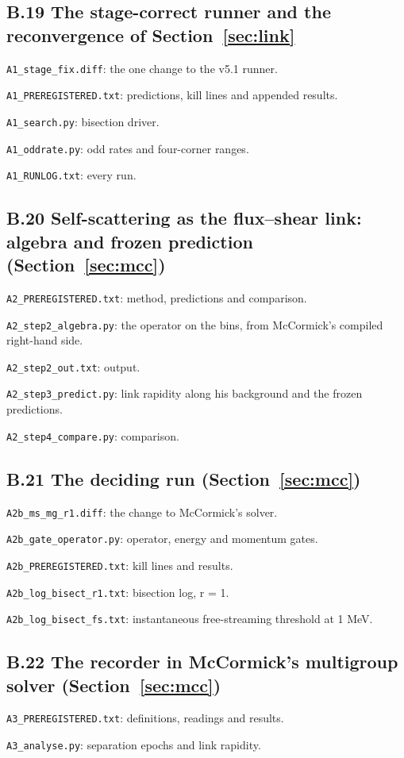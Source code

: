 \subsection*{B.19 The stage-correct runner and the reconvergence of Section~\ref{sec:link}}
\noindent\texttt{A1\_stage\_fix.diff}: the one change to the v5.1 runner.

\noindent\texttt{A1\_PREREGISTERED.txt}: predictions, kill lines and appended results.

\noindent\texttt{A1\_search.py}: bisection driver.

\noindent\texttt{A1\_oddrate.py}: odd rates and four-corner ranges.

\noindent\texttt{A1\_RUNLOG.txt}: every run.

\subsection*{B.20 Self-scattering as the flux--shear link: algebra and frozen prediction (Section~\ref{sec:mcc})}
\noindent\texttt{A2\_PREREGISTERED.txt}: method, predictions and comparison.

\noindent\texttt{A2\_step2\_algebra.py}: the operator on the bins, from McCormick's compiled right-hand side.

\noindent\texttt{A2\_step2\_out.txt}: output.

\noindent\texttt{A2\_step3\_predict.py}: link rapidity along his background and the frozen predictions.

\noindent\texttt{A2\_step4\_compare.py}: comparison.

\subsection*{B.21 The deciding run (Section~\ref{sec:mcc})}
\noindent\texttt{A2b\_ms\_mg\_r1.diff}: the change to McCormick's solver.

\noindent\texttt{A2b\_gate\_operator.py}: operator, energy and momentum gates.

\noindent\texttt{A2b\_PREREGISTERED.txt}: kill lines and results.

\noindent\texttt{A2b\_log\_bisect\_r1.txt}: bisection log, r = 1.

\noindent\texttt{A2b\_log\_bisect\_fs.txt}: instantaneous free-streaming threshold at 1 MeV.

\subsection*{B.22 The recorder in McCormick's multigroup solver (Section~\ref{sec:mcc})}
\noindent\texttt{A3\_PREREGISTERED.txt}: definitions, readings and results.

\noindent\texttt{A3\_analyse.py}: separation epochs and link rapidity.

